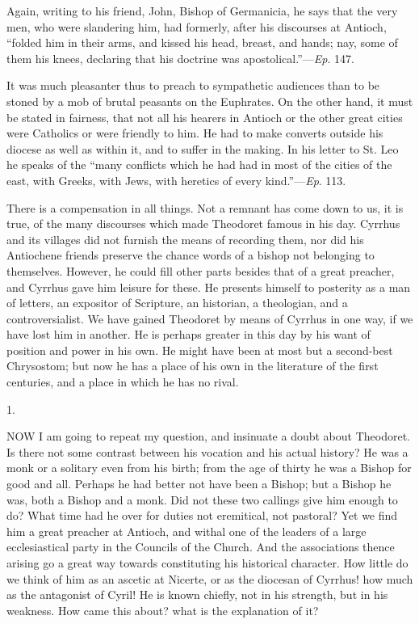 Again, writing to his friend, John, Bishop of Germanicia, he says
that the very men, who were slandering him, had formerly, after his
discourses at Antioch, ``folded him in their arms, and kissed his
head, breast, and hands; nay, some of them his knees, declaring that
his doctrine was apostolical.''—\emph{Ep}. 147.

It was much pleasanter thus to preach to sympathetic audiences than
to be stoned by a mob of brutal peasants on the Euphrates. On the
other hand, it must be stated in fairness, that not all his hearers in
Antioch or the other great cities were Catholics or were friendly to
him. He had to make converts outside his diocese as well as within it,
and to suffer in the making. In his letter to St. Leo he speaks of the
``many conflicts which he had had in most of the cities of the
east, with Greeks, with Jews, with heretics of every kind.''—\emph{Ep}.
113.

There is a compensation in all things. Not a remnant has come down
to us, it is true, of the many discourses which made Theodoret famous
in his day. Cyrrhus and its villages did not furnish the means of
recording them, nor did his Antiochene friends preserve the chance
words of a bishop not belonging to themselves. However, he could fill
other parts besides that of a great preacher, and Cyrrhus gave him
leisure for these. He presents himself to posterity as a man of
letters, an expositor of Scripture, an historian, a theologian,
and a controversialist. We have gained Theodoret by means of Cyrrhus
in one way, if we have lost him in another. He is perhaps greater in
this day by his want of position and power in his own. He might have
been at most but a second-best Chrysostom; but now he has a place of
his own in the literature of the first centuries, and a place in which
he has no rival.


1.

NOW I am going to repeat my question, and
insinuate a doubt about Theodoret. Is there not some contrast between
his vocation and his actual history? He was a monk or a solitary even
from his birth; from the age of thirty he was a Bishop for good and
all. Perhaps he had better not have been a Bishop; but a Bishop he
was, both a Bishop and a monk. Did not these two callings give him
enough to do? What time had he over for duties not eremitical, not
pastoral? Yet we find him a great preacher at Antioch, and withal one
of the leaders of a large ecclesiastical party in the Councils of the
Church. And the associations thence arising go a great way towards
constituting his historical character. How little do we think of him
as an ascetic at Nicerte, or as the diocesan of Cyrrhus! how much as
the antagonist of Cyril! He is known chiefly, not in his strength, but
in his weakness. How came this about? what is the explanation of it?

